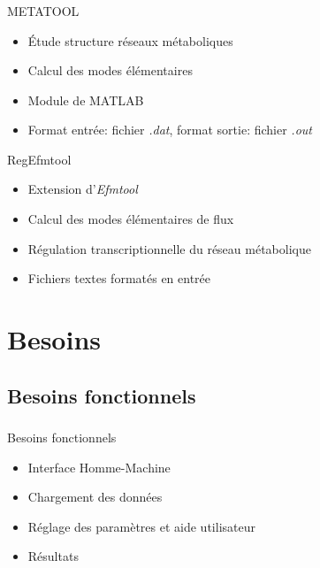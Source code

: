 \documentclass[11pt]{beamer}
\begin{document}
\begin{frame}
\frametitle{\secname}
	\begin{block}{METATOOL}
	\begin{itemize}
	\item Étude structure réseaux métaboliques
	\item Calcul des modes élémentaires
	\item Module de MATLAB 
	\item Format entrée: fichier \textit{.dat}, format sortie: fichier \textit{.out}
	
	\end{itemize}
	\end{block}	
	
	\begin{block}{RegEfmtool}
	\begin{itemize}
	\item Extension d'\textit{Efmtool}
	\item Calcul des modes élémentaires de flux
	\item Régulation transcriptionnelle du réseau métabolique
	\item Fichiers textes formatés en entrée
	\end{itemize}
	\end{block}
\end{frame}

\section{Besoins	}	

\subsection{Besoins fonctionnels}

\begin{frame}
	\frametitle{\subsecname}
	\begin{block}{Besoins fonctionnels}
		\begin{itemize}
		\item Interface Homme-Machine
		\item Chargement des données
		\item Réglage des paramètres et aide utilisateur
		\item Résultats
		\end{itemize}
	\end{block}
\end{frame}
\end{document}

